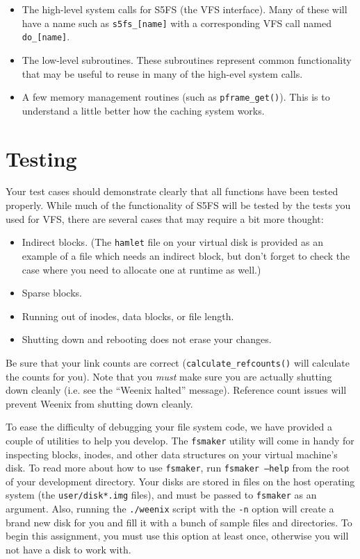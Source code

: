 \begin{itemize}

\item The high-level system calls for S5FS (the VFS interface).  Many of these will have a name such as \texttt{s5fs\_[name]} with a corresponding VFS call named \texttt{do\_[name]}.

\item The low-level subroutines.  These subroutines represent common functionality that may be useful to reuse in many of the high-evel system calls.

\item A few memory management routines (such as \texttt{pframe\_get()}).  This is to understand a little better how the caching system works.

\end{itemize}

\section{Testing}

Your test cases should demonstrate clearly that all functions have been tested properly. While much of the functionality of S5FS will be tested by the tests you used for VFS, there are several cases that may require a bit more thought:

\begin{itemize}
    \item Indirect blocks. (The \texttt{hamlet} file on your virtual disk is provided as an example of a file which needs an indirect block, but don't forget to check the case where you need to allocate one at runtime as well.)
    \item Sparse blocks.
    \item Running out of inodes, data blocks, or file length.
    \item Shutting down and rebooting does not erase your changes.
\end{itemize}

Be sure that your link counts are correct (\texttt{calculate\_refcounts()} will calculate the counts for you). Note that you \emph{must} make sure you are actually shutting down cleanly (i.e. see the ``Weenix halted'' message). Reference count issues will prevent Weenix from shutting down cleanly.

To ease the difficulty of debugging your file system code, we have provided a couple of utilities to help you develop. The \texttt{fsmaker} utility will come in handy for inspecting blocks, inodes, and other data structures on your virtual machine's disk. To read more about how to use \texttt{fsmaker}, run \texttt{fsmaker --help} from the root of your development directory. Your disks are stored in files on the host operating system (the \texttt{user/disk*.img} files), and must be passed to \texttt{fsmaker} as an argument. Also, running the \texttt{./weenix} script with the \texttt{-n} option will create a brand new disk for you and fill it with a bunch of sample files and directories. To begin this assignment, you must use this option at least once, otherwise you will not have a disk to work with.

